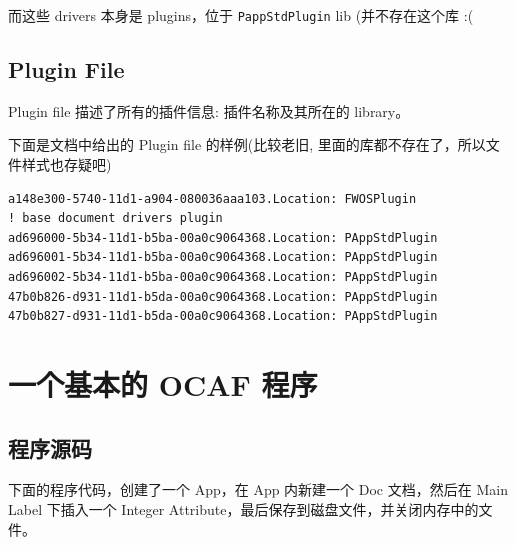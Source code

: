 \documentclass[11pt]{article}
\let\oldsection\section
\renewcommand{\section}{\clearpage\oldsection}
\begin{document}
而这些 drivers 本身是 plugins，位于 \texttt{PappStdPlugin} lib (并不存在这个库 :(
\subsection{Plugin File}
\label{sec:org962971f}

Plugin file 描述了所有的插件信息: 插件名称及其所在的 library。

下面是文档中给出的 Plugin file 的样例(比较老旧, 里面的库都不存在了，所以文件样式也存疑吧)

\begin{verbatim}
a148e300-5740-11d1-a904-080036aaa103.Location: FWOSPlugin
! base document drivers plugin
ad696000-5b34-11d1-b5ba-00a0c9064368.Location: PAppStdPlugin
ad696001-5b34-11d1-b5ba-00a0c9064368.Location: PAppStdPlugin
ad696002-5b34-11d1-b5ba-00a0c9064368.Location: PAppStdPlugin
47b0b826-d931-11d1-b5da-00a0c9064368.Location: PAppStdPlugin
47b0b827-d931-11d1-b5da-00a0c9064368.Location: PAppStdPlugin
\end{verbatim}
\section{一个基本的 OCAF 程序}
\label{sec:org864a30f}

\subsection{程序源码}
\label{sec:org3093dec}

下面的程序代码，创建了一个 App，在 App 内新建一个 Doc 文档，然后在 Main Label 下插入一个 Integer Attribute，最后保存到磁盘文件，并关闭内存中的文件。
\end{document}
